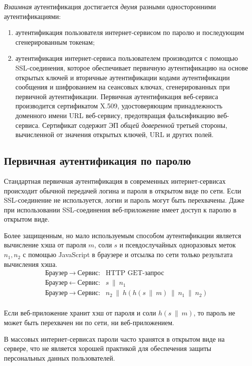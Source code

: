 \documentclass[10pt,a4paper]{book}
\begin{document}
\emph{Взаимная} аутентификация достигается \emph{двумя} разными односторонними аутентификациями:
\begin{enumerate}
    \item аутентификация пользователя интернет-сервисом по паролю и последующим сгенерированным токенам;
    \item аутентификация интернет-сервиса пользователем производится с помощью SSL-соединения, которое обеспечивает первичную аутентификацию на основе открытых ключей и вторичные аутентификации кодами аутентификации сообщения и шифрованием на сеансовых ключах, сгенерированных при первичной аутентификации. Первичная аутентификация веб-сервиса производится сертификатом X.509, удостоверяющим принадлежность доменного имени URL веб-сервису, предотвращая фальсификацию веб-сервиса. Сертификат содержит ЭП \emph{общей доверенной} третьей стороны, вычисленной от значения открытых ключей, URL и других полей.
\end{enumerate}


\subsection{Первичная аутентификация по паролю}

Стандартная первичная аутентификация в современных интернет-сервисах происходит обычной передачей логина и пароля в открытом виде по сети. Если SSL-соединение не используется, логин и пароль могут быть перехвачены. Даже при использовании SSL-соединения веб-приложение имеет доступ к паролю в открытом виде.

Более защищенным, но мало используемым способом аутентификации является вычисление хэша от пароля $m$, соли $s$ и псевдослучайных одноразовых меток $n_1, n_2$ с помощью JavaScript в браузере и отсылка по сети только результата вычисления хэша.
\[ \begin{array}{ll}
    \text{Браузер} ~\rightarrow~ \text{Сервис:} & \text{HTTP GET-запрос} \\
    \text{Браузер} ~\leftarrow~ \text{Сервис:}  & s ~\|~ n_1 \\
    \text{Браузер} ~\rightarrow~ \text{Сервис:} & n_2 ~\|~ h( h(s ~\|~ m) ~\|~ n_1 ~\|~ n_2) \\
\end{array} \]

Если веб-приложение хранит хэш от пароля и соли $h(s ~\|~ m)$, то пароль не может быть перехвачен ни по сети, ни веб-приложением.

В массовых интернет-сервисах пароли часто хранятся в открытом виде на сервере, что не является хорошей практикой для обеспечения защиты персональных данных пользователей.
\end{document}
